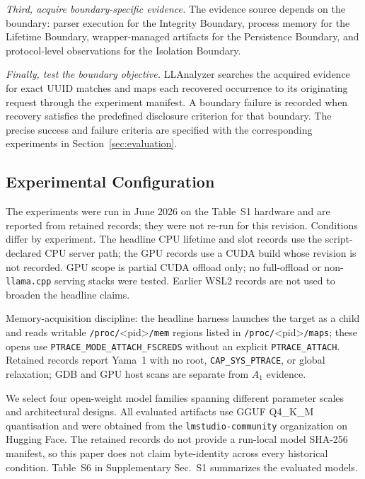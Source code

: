 \documentclass[journal,tifs]{IEEEtran}
\begin{document}
\textit{Third, acquire boundary-specific evidence.}
The evidence source depends on the boundary: parser execution for the
Integrity Boundary, process memory for the Lifetime Boundary,
wrapper-managed artifacts for the Persistence Boundary, and
protocol-level observations for the Isolation Boundary.

\textit{Finally, test the boundary objective.}
LLAnalyzer searches the acquired evidence for exact UUID matches and maps
each recovered occurrence to its originating request through the
experiment manifest. A boundary failure is recorded when recovery
satisfies the predefined disclosure criterion for that boundary. The
precise success and failure criteria are specified with the corresponding
experiments in Section~\ref{sec:evaluation}.


\subsection{Experimental Configuration}

The experiments were run in June 2026 on the Table~S1 hardware and are
reported from retained records; they were not re-run for this revision.
Conditions differ by experiment. The headline CPU lifetime and slot
records use the script-declared CPU server path; the GPU records use a
CUDA build whose revision is not recorded. GPU scope is partial CUDA
offload only; no full-offload or non-\texttt{llama.cpp} serving stacks were
tested. Earlier WSL2 records are not used to broaden the headline claims.

Memory-acquisition discipline: the headline harness launches the target as a
child and reads writable \texttt{/proc/}\textless pid\textgreater\texttt{/mem}
regions listed in \texttt{/proc/}\textless pid\textgreater\texttt{/maps};
\linebreak
these opens use \texttt{PTRACE\_MODE\_ATTACH\_FSCREDS} without an explicit
\texttt{PTRACE\_ATTACH}. Retained records report Yama~1 with no root,
\texttt{CAP\_SYS\_PTRACE}, or global relaxation; GDB and GPU host scans are
separate from ${A}_1$ evidence.

We select four open-weight model families spanning different parameter
scales and architectural designs. All evaluated artifacts use GGUF
Q4\_K\_M quantisation and were obtained from the
\texttt{lmstudio-community} organization on Hugging Face. The retained
records do not provide a run-local model SHA-256 manifest, so this paper
does not claim byte-identity across every historical condition.
Table~S6 in Supplementary Sec.~S1 summarizes the evaluated models.
\end{document}
